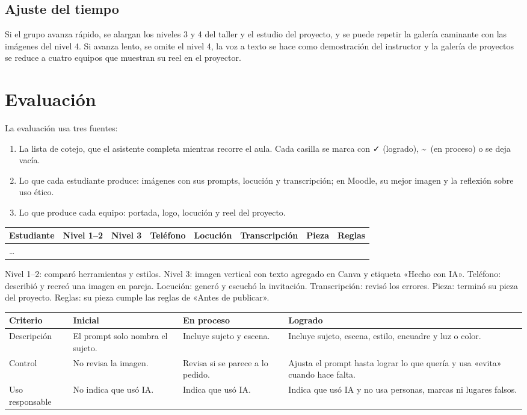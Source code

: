 \documentclass[11pt,a4paper]{article}
\begin{document}
\subsection{Ajuste del tiempo}
Si el grupo avanza rápido, se alargan los niveles 3 y 4 del taller y el estudio del proyecto, y se puede repetir la galería caminante con las imágenes del nivel 4. Si avanza lento, se omite el nivel 4, la voz a texto se hace como demostración del instructor y la galería de proyectos se reduce a cuatro equipos que muestran su reel en el proyector.

\section{Evaluación}
La evaluación usa tres fuentes:
\begin{enumerate}
\item La lista de cotejo, que el asistente completa mientras recorre el aula. Cada casilla se marca con {\sffamily ✓} (logrado), \textasciitilde\ (en proceso) o se deja vacía.
\item Lo que cada estudiante produce: imágenes con sus prompts, locución y transcripción; en Moodle, su mejor imagen y la reflexión sobre uso ético.
\item Lo que produce cada equipo: portada, logo, locución y reel del proyecto.
\end{enumerate}

\medskip
\footnotesize
\noindent\begin{tabularx}{\textwidth}{@{}l*{7}{>{\centering\arraybackslash}X}@{}}\toprule
\textbf{Estudiante} & \textbf{Nivel 1--2} & \textbf{Nivel 3} & \textbf{Teléfono} & \textbf{Locución} & \textbf{Trans\-cripción} & \textbf{Pieza} & \textbf{Reglas}\\\midrule
\dots & & & & & & & \\\bottomrule
\end{tabularx}

\smallskip
\textcolor{gris}{Nivel 1--2: comparó herramientas y estilos. Nivel 3: imagen vertical con texto agregado en Canva y etiqueta «Hecho con IA». Teléfono: describió y recreó una imagen en pareja. Locución: generó y escuchó la invitación. Transcripción: revisó los errores. Pieza: terminó su pieza del proyecto. Reglas: su pieza cumple las reglas de «Antes de publicar».}

\medskip
\noindent\begin{tabularx}{\textwidth}{@{}p{2.6cm}XXX@{}}\toprule
\textbf{Criterio} & \textbf{Inicial} & \textbf{En proceso} & \textbf{Logrado}\\\midrule
Descripción & El prompt solo nombra el sujeto. & Incluye sujeto y escena. & Incluye sujeto, escena, estilo, encuadre y luz o color.\\
Control & No revisa la imagen. & Revisa si se parece a lo pedido. & Ajusta el prompt hasta lograr lo que quería y usa «evita» cuando hace falta.\\
Uso responsable & No indica que usó IA. & Indica que usó IA. & Indica que usó IA y no usa personas, marcas ni lugares falsos.\\\bottomrule
\end{tabularx}
\normalsize
\end{document}
